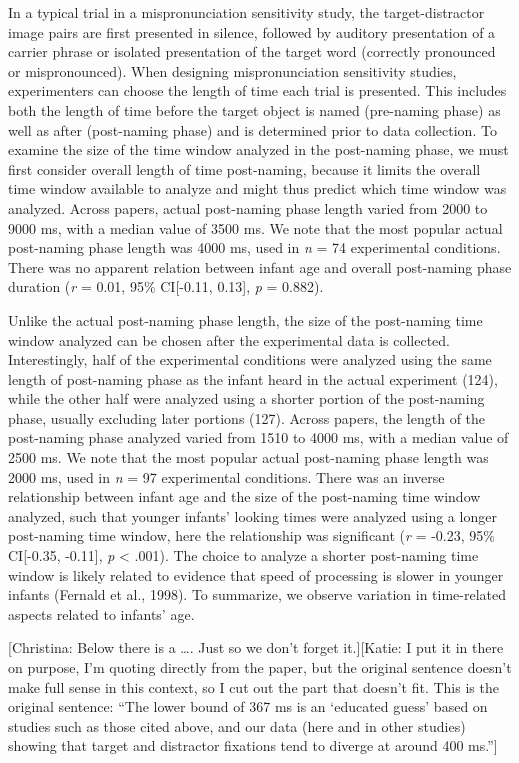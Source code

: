 \documentclass[man]{apa6}
\theoremstyle{definition}
\theoremstyle{definition}
\theoremstyle{definition}
\theoremstyle{remark}
\begin{document}
In a typical trial in a mispronunciation sensitivity study, the
target-distractor image pairs are first presented in silence, followed
by auditory presentation of a carrier phrase or isolated presentation of
the target word (correctly pronounced or mispronounced). When designing
mispronunciation sensitivity studies, experimenters can choose the
length of time each trial is presented. This includes both the length of
time before the target object is named (pre-naming phase) as well as
after (post-naming phase) and is determined prior to data collection. To
examine the size of the time window analyzed in the post-naming phase,
we must first consider overall length of time post-naming, because it
limits the overall time window available to analyze and might thus
predict which time window was analyzed. Across papers, actual
post-naming phase length varied from 2000 to 9000 ms, with a median
value of 3500 ms. We note that the most popular actual post-naming phase
length was 4000 ms, used in \emph{n} = 74 experimental conditions. There
was no apparent relation between infant age and overall post-naming
phase duration (\emph{r} = 0.01, 95\% CI{[}-0.11, 0.13{]}, \emph{p} =
0.882).

Unlike the actual post-naming phase length, the size of the post-naming
time window analyzed can be chosen after the experimental data is
collected. Interestingly, half of the experimental conditions were
analyzed using the same length of post-naming phase as the infant heard
in the actual experiment (124), while the other half were analyzed using
a shorter portion of the post-naming phase, usually excluding later
portions (127). Across papers, the length of the post-naming phase
analyzed varied from 1510 to 4000 ms, with a median value of 2500 ms. We
note that the most popular actual post-naming phase length was 2000 ms,
used in \emph{n} = 97 experimental conditions. There was an inverse
relationship between infant age and the size of the post-naming time
window analyzed, such that younger infants' looking times were analyzed
using a longer post-naming time window, here the relationship was
significant (\emph{r} = -0.23, 95\% CI{[}-0.35, -0.11{]}, \emph{p}
\textless{} .001). The choice to analyze a shorter post-naming time
window is likely related to evidence that speed of processing is slower
in younger infants (Fernald et al., 1998). To summarize, we observe
variation in time-related aspects related to infants' age.

{[}Christina: Below there is a \ldots{}. Just so we don't forget
it.{]}{[}Katie: I put it in there on purpose, I'm quoting directly from
the paper, but the original sentence doesn't make full sense in this
context, so I cut out the part that doesn't fit. This is the original
sentence: \enquote{The lower bound of 367 ms is an `educated guess'
based on studies such as those cited above, and our data (here and in
other studies) showing that target and distractor fixations tend to
diverge at around 400 ms.}{]}
\end{document}
